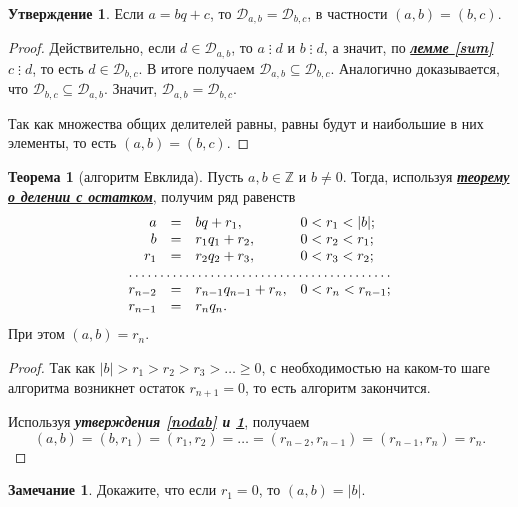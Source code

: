 \documentclass[14pt, a4paper]{extarticle}
\theoremstyle{definition}
\newtheorem{theorem}{Теорема}
\newtheorem*{remark}{Замечание}
\newtheorem{statement}{Утверждение}
\newcommand{\divisible}{\mathop{\vdots}}
\begin{document}
	\begin{statement}
	\label{nodabc}
		Если $a=bq+c$, то $\mathcal{D}_{a,b}=\mathcal{D}_{b,c}$, в частности \mbox{$(a,b)=(b,c)$}.
	\end{statement}
	\begin{proof}
		Действительно, если $d\in\mathcal{D}_{a,b}$, то $a\divisible d$ и $b\divisible d$, а значит, по \hyperref[sum]{\textbf{\textit{лемме \ref*{sum}}}} $c\divisible d$, то есть $d\in\mathcal{D}_{b,c}$. В итоге получаем \mbox{$\mathcal{D}_{a,b}\subseteq\mathcal{D}_{b,c}$}. Аналогично доказывается, что $\mathcal{D}_{b,c}\subseteq\mathcal{D}_{a,b}$. Значит, $\mathcal{D}_{a,b}=\mathcal{D}_{b,c}$.
		
		Так как множества общих делителей равны, равны будут и наибольшие в них элементы, то есть $(a,b)=(b,c)$.
	\end{proof}

	\begin{theorem}[алгоритм Евклида]
		Пусть $a,b\in\mathbb{Z}$ и $b\neq0$. Тогда, используя \hyperref[ost]{\textbf{\textit{теорему о делении с остатком}}}, получим ряд равенств
		\begin{equation}
		\label{eq5}
		\begin{array}{rcll}
			a&=&bq+r_1,&0<r_1<|b|;\\
			b&=&r_1q_1+r_2,&0<r_2<r_1;\\
			r_1&=&r_2q_2+r_3,&0<r_3<r_2;\\
			\hdotsfor{4}\\
			r_{n-2}&=&r_{n-1}q_{n-1}+r_n,&0<r_n<r_{n-1};\\
			r_{n-1}&=&r_nq_n.
		\end{array}
		\end{equation}
		При этом $(a,b)=r_n$.
	\end{theorem}
	\begin{proof}
		Так как $|b|>r_1>r_2>r_3>\dots\geqslant0$, с необходимостью на каком-то шаге алгоритма возникнет остаток $r_{n+1}=0$, то есть алгоритм закончится.
		
		Используя \textbf{\textit{утверждения \ref{nodab} и \ref{nodabc}}}, получаем
		$$(a,b)=(b,r_1)=(r_1,r_2)=\dots=(r_{n-2},r_{n-1})=(r_{n-1},r_n)=r_n.$$
	\end{proof}

	\begin{remark}
		Докажите, что если $r_1=0$, то $(a,b)=|b|$.
	\end{remark}
\end{document}
